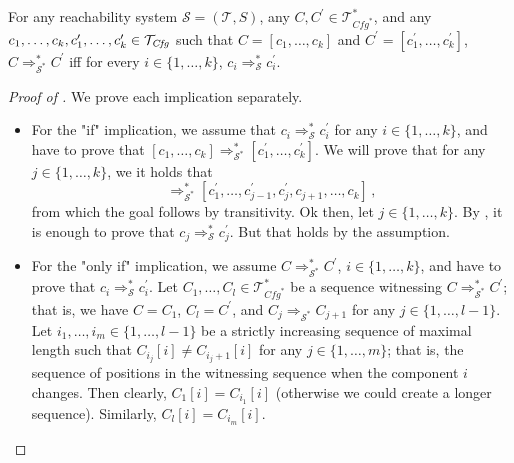 \begin{lemma}\label{lem:reachComposite}
    For any reachability system $\mathcal{S} = (\mathcal{T}, S)$, any $C,C^\prime \in \mathcal{T}^*_{\mathit{Cfg}^*}$,
    and any $c_1,\ldots,c_k,c_1^\prime,\ldots,c_k^\prime \in \mathcal{T}_{\mathit{Cfg}}$ such that
    $C = [c_1,\ldots,c_k]$ and $C^\prime = [c_1^\prime,\ldots,c_k^\prime]$,
    $C \Rightarrow^*_{\mathcal{S}^*} C^\prime$ iff for every $i \in \{ 1, \ldots, k \}$,
    $c_i \Rightarrow^*_{\mathcal{S}} c_i^\prime$.
\end{lemma}
\begin{proof}[Proof of ]
We prove each implication separately.
\begin{itemize}
    \item For the "if" implication, we assume that $c_i \Rightarrow_{\mathcal{S}}^* c_i^\prime$
          for any $i \in \{ 1, \ldots, k \}$,
          and have to prove that $[c_1,\ldots,c_k] \Rightarrow_{\mathcal{S}^*}^* [c_1^\prime,\ldots,c_k^\prime]$.
          We will prove that for any $j \in \{ 1, \ldots, k \}$, we it holds that
          \begin{equation*}
           [c^\prime_1,\ldots,c^\prime_{j-1}, c_j, c_{j+1}, \ldots, c_k] \Rightarrow_{\mathcal{S}^*}^* [c^\prime_1,\ldots,c^\prime_{j-1}, c_j^\prime, c_{j+1}, \ldots, c_k]    \, ,
          \end{equation*}
          from which the goal follows by transitivity.
          Ok then, let $j \in \{ 1, \ldots, k \}$.
          By , it is enough to prove that $c_j \Rightarrow^*_{\mathcal{S}} c_j^\prime$.
          But that holds by the assumption.
    \item For the "only if" implication, we assume $C \Rightarrow^*_{\mathcal{S}^*} C^\prime$,
          $i \in \{ 1,\ldots,k \}$, and have to prove that $c_i \Rightarrow^*_{\mathcal{S}} c_i^\prime$.
          Let $C_1,\ldots,C_l \in \mathcal{T}^*_{\mathit{Cfg}^*}$ be a sequence witnessing $C \Rightarrow^*_{\mathcal{S}^*} C^\prime$;
          that is, we have $C = C_1$, $C_l = C^\prime$, and $C_j \Rightarrow_{\mathcal{S}^*} C_{j+1}$ for any $j \in \{ 1, \ldots, l-1 \}$.
          Let $i_1,\ldots,i_m \in \{ 1,\ldots,l-1 \}$ be a strictly increasing sequence of maximal length such that
          $C_{i_j}[i] \not = C_{i_j + 1}[i]$ for any $j \in \{ 1,\ldots,m \}$;
          that is, the sequence of positions in the witnessing sequence when the component $i$ changes.
          Then clearly, $C_1[i] = C_{i_1}[i]$ (otherwise we could create a longer sequence).
          Similarly, $C_l[i] = C_{i_m}[i]$.

\end{itemize}
\end{proof}
